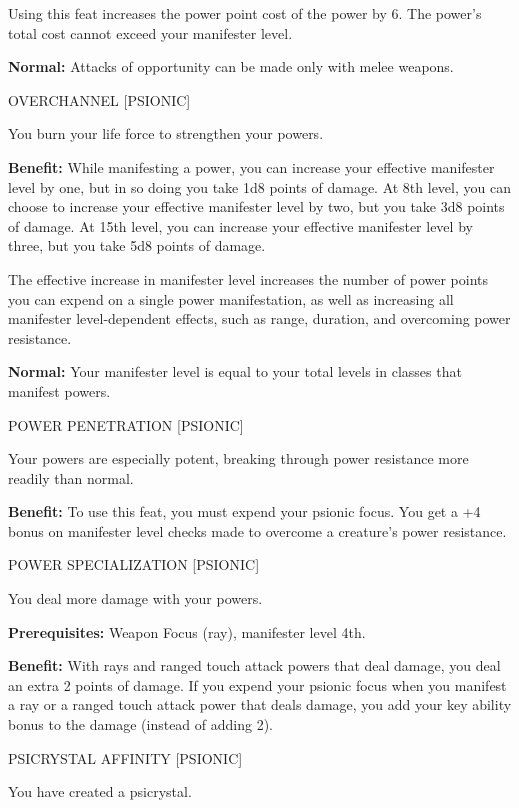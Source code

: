 \documentclass{article}
\begin{document}
Using this feat increases the power point cost of the power by 6. The power's total 
cost cannot exceed your manifester level.

\textbf{Normal:} Attacks of opportunity can be made only with melee weapons.

\vspace{12pt}
OVERCHANNEL [PSIONIC]

You burn your life force to strengthen your powers.

\textbf{Benefit:} While manifesting a power, you can increase your effective manifester 
level by one, but in so doing you take 1d8 points of damage. At 8th level, you 
can choose to increase your effective manifester level by two, but you take 3d8 
points of damage. At 15th level, you can increase your effective manifester level 
by three, but you take 5d8 points of damage.

The effective increase in manifester level increases the number of power points 
you can expend on a single power manifestation, as well as increasing all manifester 
level-dependent effects, such as range, duration, and overcoming power resistance.

\textbf{Normal:} Your manifester level is equal to your total levels in classes 
that manifest powers.

\vspace{12pt}
POWER PENETRATION [PSIONIC]

Your powers are especially potent, breaking through power resistance more readily 
than normal.

\textbf{Benefit:} To use this feat, you must expend your psionic focus. You get 
a +4 bonus on manifester level checks made to overcome a creature's power resistance.

\vspace{12pt}
POWER SPECIALIZATION [PSIONIC]

You deal more damage with your powers.

\textbf{Prerequisites:} Weapon Focus (ray), manifester level 4th.

\textbf{Benefit:} With rays and ranged touch attack powers that deal damage, you 
deal an extra 2 points of damage. If you expend your psionic focus when you manifest 
a ray or a ranged touch attack power that deals damage, you add your key ability 
bonus to the damage (instead of adding 2).

\vspace{12pt}
PSICRYSTAL AFFINITY [PSIONIC]

You have created a psicrystal.
\end{document}
